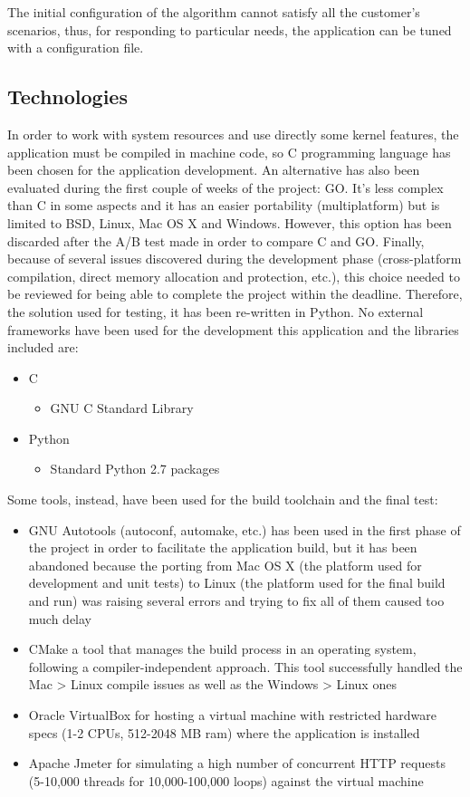 \documentclass[conference]{IEEEtran}
\begin{document}
The initial configuration of the algorithm cannot satisfy all the customer’s scenarios, thus, for responding to particular needs, the application can be tuned with a configuration file.

\subsection{Technologies}
In order to work with system resources and use directly some kernel features, the application must be compiled in machine code, so C programming language has been chosen for the application development. 
An alternative has also been evaluated during the first couple of weeks of the project: GO. It’s less complex than C in some aspects and it has an easier portability (multiplatform) but is limited to BSD, Linux, Mac OS X and Windows. However, this option has been discarded after the A/B test made in order to compare C and GO.
Finally, because of several issues discovered during the development phase (cross-platform compilation, direct memory allocation and protection, etc.), this choice needed to be reviewed for being able to complete the project within the deadline. Therefore, the solution used for testing, it has been re-written in Python.
No external frameworks have been used for the development this application and the libraries included are:
\begin{itemize}
\item C
  \begin{itemize}
  \item GNU C Standard Library
  \end{itemize}
\item Python
  \begin{itemize}
  \item Standard Python 2.7 packages 
  \end{itemize}
\end{itemize}
Some tools, instead, have been used for the build toolchain and the final test:
\begin{itemize}
\item GNU Autotools (autoconf, automake, etc.) has been used in the first phase of the project in order to facilitate the application build, but it has been abandoned because the porting from Mac OS X (the platform used for development and unit tests) to Linux (the platform used for the final build and run) was raising several errors and trying to fix all of them caused too much delay
\item CMake a tool that manages the build process in an operating system, following a compiler-independent approach. This tool successfully handled the Mac > Linux compile issues as well as the Windows > Linux ones
\item Oracle VirtualBox for hosting a virtual machine with restricted hardware specs (1-2 CPUs, 512-2048 MB ram) where the application is installed
\item Apache Jmeter for simulating a high number of concurrent HTTP requests (5-10,000 threads for 10,000-100,000 loops) against the virtual machine
\end{itemize}
\end{document}
